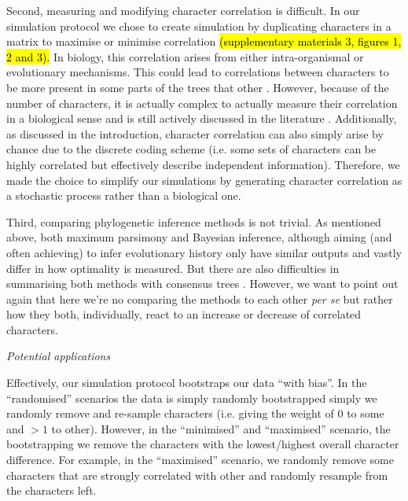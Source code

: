 \documentclass[12pt,letterpaper]{article}
\renewcommand{\subsection}[1]{%
\bigskip
\begin{center}
\begin{large}
\normalfont\itshape #1
\end{large}
\end{center}}
\begin{document}
Second, measuring and modifying character correlation is difficult. 
In our simulation protocol we chose to create simulation by duplicating characters in a matrix to maximise or minimise correlation
\hl{(supplementary materials 3, figures 1, 2 and 3).}
In biology, this correlation arises from either intra-organismal or evolutionary mechanisms.
This could lead to correlations between characters to be more present in some parts of the trees that other \citep[e.g. in the case of inapplicable data ][]{BrazeauNA}.
However, because of the number of characters, it is actually complex to actually measure their correlation in a biological sense and is still actively discussed in the literature \citep{Lande1983,Maddison1990,Pagel1994,Pagel2006,goswami2006morphological,goswami2010,goswami2014macroevolutionary,Grabowski2016}.
Additionally, as discussed in the introduction, character correlation can also simply arise by chance due to the discrete coding scheme (i.e. some sets of characters can be highly correlated but effectively describe independent information).
Therefore, we made the choice to simplify our simulations by generating character correlation as a stochastic process rather than a biological one.

Third, comparing phylogenetic inference methods is not trivial.
As mentioned above, both maximum parsimony and Bayesian inference, although aiming (and often achieving) to infer evolutionary history only have similar outputs and vastly differ in how optimality is measured.
But there are also difficulties in summarising both methods with consensus trees \cite{oReilly2017efficacy}.
However, we want to point out again that here we're no comparing the methods to each other \textit{per se} but rather how they both, individually, react to an increase or decrease of correlated characters.

\subsection{Potential applications}
Effectively, our simulation protocol bootstraps our data ``with bias''.
In the ``randomised'' scenarios the data is simply randomly bootstrapped simply we randomly remove and re-sample characters (i.e. giving the weight of $0$ to some and $>1$ to other).
However, in the ``minimised'' and ``maximised'' scenario, the bootstrapping we remove the characters with the lowest/highest overall character difference.
For example, in the ``maximised'' scenario, we randomly remove some characters that are strongly correlated with other and randomly resample from the characters left.
\end{document}
